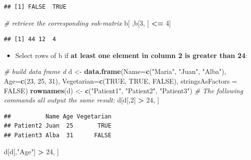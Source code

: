 \documentclass[]{book}
\newenvironment{Shaded}{\begin{snugshade}}{\end{snugshade}}
\newcommand{\CommentTok}[1]{\textcolor[rgb]{0.56,0.35,0.01}{\textit{#1}}}
\newcommand{\DataTypeTok}[1]{\textcolor[rgb]{0.13,0.29,0.53}{#1}}
\newcommand{\DecValTok}[1]{\textcolor[rgb]{0.00,0.00,0.81}{#1}}
\newcommand{\KeywordTok}[1]{\textcolor[rgb]{0.13,0.29,0.53}{\textbf{#1}}}
\newcommand{\NormalTok}[1]{#1}
\newcommand{\OperatorTok}[1]{\textcolor[rgb]{0.81,0.36,0.00}{\textbf{#1}}}
\newcommand{\OtherTok}[1]{\textcolor[rgb]{0.56,0.35,0.01}{#1}}
\newcommand{\StringTok}[1]{\textcolor[rgb]{0.31,0.60,0.02}{#1}}
\providecommand{\tightlist}{%
  \setlength{\itemsep}{0pt}\setlength{\parskip}{0pt}}
\begin{document}
\begin{verbatim}
## [1] FALSE  TRUE
\end{verbatim}

\begin{Shaded}
\begin{Highlighting}[]
\CommentTok{# retrieve the corresponding sub-matrix}
\NormalTok{b[ ,b[}\DecValTok{3}\NormalTok{, ] }\OperatorTok{<=}\StringTok{ }\DecValTok{4}\NormalTok{]}
\end{Highlighting}
\end{Shaded}

\begin{verbatim}
## [1] 44 12  4
\end{verbatim}

\begin{itemize}
\tightlist
\item
  Select rows of b if \textbf{at least one element in column 2 is greater than 24}:
\end{itemize}

\begin{Shaded}
\begin{Highlighting}[]
\CommentTok{# build data frame d}
\NormalTok{d <-}\StringTok{ }\KeywordTok{data.frame}\NormalTok{(}\DataTypeTok{Name=}\KeywordTok{c}\NormalTok{(}\StringTok{"Maria"}\NormalTok{, }\StringTok{"Juan"}\NormalTok{, }\StringTok{"Alba"}\NormalTok{), }
        \DataTypeTok{Age=}\KeywordTok{c}\NormalTok{(}\DecValTok{23}\NormalTok{, }\DecValTok{25}\NormalTok{, }\DecValTok{31}\NormalTok{),}
        \DataTypeTok{Vegetarian=}\KeywordTok{c}\NormalTok{(}\OtherTok{TRUE}\NormalTok{, }\OtherTok{TRUE}\NormalTok{, }\OtherTok{FALSE}\NormalTok{),}
        \DataTypeTok{stringsAsFactors =} \OtherTok{FALSE}\NormalTok{)}
\KeywordTok{rownames}\NormalTok{(d) <-}\StringTok{ }\KeywordTok{c}\NormalTok{(}\StringTok{"Patient1"}\NormalTok{, }\StringTok{"Patient2"}\NormalTok{, }\StringTok{"Patient3"}\NormalTok{)}
\CommentTok{# The following commands all output the same result:}
\NormalTok{d[d[,}\DecValTok{2}\NormalTok{] }\OperatorTok{>}\StringTok{ }\DecValTok{24}\NormalTok{, ]}
\end{Highlighting}
\end{Shaded}

\begin{verbatim}
##          Name Age Vegetarian
## Patient2 Juan  25       TRUE
## Patient3 Alba  31      FALSE
\end{verbatim}

\begin{Shaded}
\begin{Highlighting}[]
\NormalTok{d[d[,}\StringTok{"Age"}\NormalTok{] }\OperatorTok{>}\StringTok{ }\DecValTok{24}\NormalTok{, ]}
\end{Highlighting}
\end{Shaded}
\end{document}
